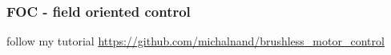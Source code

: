 \documentclass{beamer}
\begin{document}
\begin{frame}
\begin{columns}
    \begin{column}{0.5\textwidth}
    \end{column}

  \end{columns}

\end{frame}


\begin{frame}
  
  \frametitle{\bf FOC - field oriented control}

  follow my tutorial \url{https://github.com/michalnand/brushless_motor_control}
\end{frame}
\end{document}
